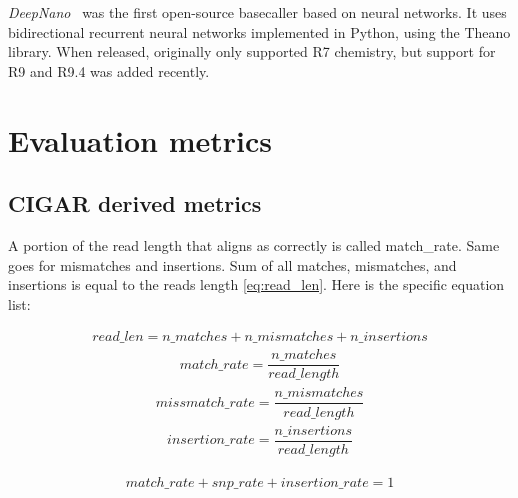 \documentclass[runningheads,a4paper]{llncs}
\begin{document}
\emph{DeepNano}~\cite{Boza2017}  was the first open-source basecaller based on neural networks. It uses bidirectional recurrent neural networks implemented in Python, using the Theano library. When released, originally only supported R7 chemistry, but support for R9 and R9.4 was added recently.

\section{Evaluation metrics}

\subsection{CIGAR derived metrics}
\label{app:evaluation:CIGAR}

A portion of the read length that aligns as correctly is called match\_rate. Same goes for mismatches and insertions.
Sum of all matches, mismatches, and insertions is equal to the reads length \ref{eq:read_len}.
Here is the specific equation list:

\begin{equation}
\begin{gathered}
\label{eq:read_len}
read\_len =  n\_matches + n\_mismatches + n\_insertions
\end{gathered}
\end{equation}
\begin{equation}
\begin{gathered}
match\_rate = \dfrac{n\_matches}{read\_length}
\end{gathered}
\end{equation}
\begin{equation}
\begin{gathered}
missmatch\_rate = \dfrac{n\_mismatches}{read\_length}
\end{gathered}
\end{equation}
\begin{equation}
\begin{gathered}
insertion\_rate = \dfrac{n\_insertions}{read\_length}
\end{gathered}
\end{equation}

\begin{equation}
\begin{gathered}
match\_rate  + snp\_rate + insertion\_rate = 1
\end{gathered}
\end{equation}
\end{document}

